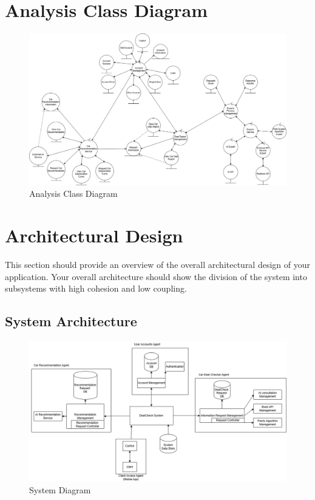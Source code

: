 \documentclass[]{article}
\begin{document}


\section{Analysis Class Diagram}
\label{sec:analysis_class_diagram}
\begin{figure}[H]
	\centering
	\includegraphics[scale=0.35]{3A04_acd.png}
	\caption{Analysis Class Diagram}\label{Fig:2.1}
\end{figure}


\section{Architectural Design}
\label{sec:architectural_design}
This section should provide an overview of the overall architectural design of your application. Your overall architecture should show the division of the system into subsystems with high cohesion and low coupling.

\subsection{System Architecture}

\begin{figure}[H]
	\centering
	\includegraphics[scale=0.45]{3A04_sys2.png}
	\caption{System Diagram}\label{Fig:2.1}
\end{figure}
\end{document}
